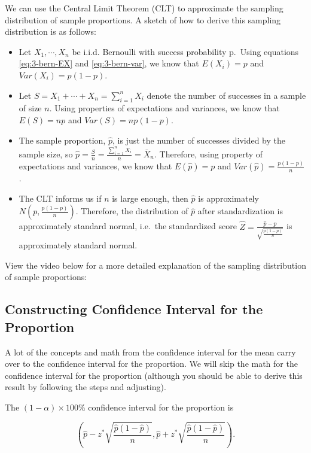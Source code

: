 \documentclass[
]{book}
\begin{document}
We can use the Central Limit Theorem (CLT) to approximate the sampling distribution of sample proportions. A sketch of how to derive this sampling distribution is as follows:

\begin{itemize}
\item
  Let \(X_1, \cdots, X_n\) be i.i.d. Bernoulli with success probability p.~Using equations \eqref{eq:3-bern-EX} and \eqref{eq:3-bern-var}, we know that \(E(X_i) = p\) and \(Var(X_i) = p(1-p)\).
\item
  Let \(S = X_1 + \cdots + X_n = \sum_{i=1}^n X_i\) denote the number of successes in a sample of size \(n\). Using properties of expectations and variances, we know that \(E(S) = np\) and \(Var(S) = np(1-p)\).
\item
  The sample proportion, \(\hat{p}\), is just the number of successes divided by the sample size, so \(\hat{p} = \frac{S}{n} = \frac{\sum_{i=1}^n X_i}{n} = \bar{X}_n\). Therefore, using property of expectations and variances, we know that \(E(\hat{p}) = p\) and \(Var(\hat{p}) = \frac{p(1-p)}{n}\).
\item
  The CLT informs us if \(n\) is large enough, then \(\hat{p}\) is approximately \(N\left(p, \frac{p(1-p)}{n}\right)\). Therefore, the distribution of \(\hat{p}\) after standardization is approximately standard normal, i.e.~the standardized score \(\hat{Z} = \frac{\hat{p}-p}{\sqrt{\frac{p(1-p)}{n}}}\) is approximately standard normal.
\end{itemize}

View the video below for a more detailed explanation of the sampling distribution of sample proportions:

\hypertarget{constructing-confidence-interval-for-the-proportion}{%
\subsection{Constructing Confidence Interval for the Proportion}\label{constructing-confidence-interval-for-the-proportion}}

A lot of the concepts and math from the confidence interval for the mean carry over to the confidence interval for the proportion. We will skip the math for the confidence interval for the proportion (although you should be able to derive this result by following the steps and adjusting).

The \((1-\alpha) \times 100\%\) confidence interval for the proportion is

\begin{equation} 
\left( \hat{p} - z^{*} \sqrt{\frac{\hat{p}(1-\hat{p})}{n}}, \hat{p} + z^{*} \sqrt{\frac{\hat{p}(1-\hat{p})}{n}} \right).
\label{eq:8-CIprop}
\end{equation}
\end{document}
